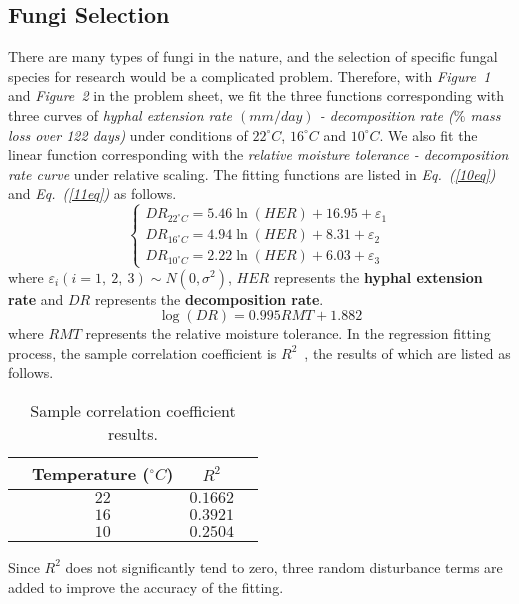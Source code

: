 \subsection{Fungi Selection}
There are many types of fungi in the nature, and the selection of specific fungal species for research would be a complicated problem. Therefore, with \textit{Figure~1} and \textit{Figure~2} in the problem sheet, we fit the three functions corresponding with three curves of \textit{hyphal extension rate $(mm/day)$ - decomposition rate ($\%$ mass loss over 122 days)} under conditions of $22^\circ C$, $16^\circ C$ and $10^\circ C$. We also fit the linear function corresponding with the \textit{relative moisture tolerance - decomposition rate curve} under relative scaling. The fitting functions are listed in \textit{Eq.~(\ref{10eq})} and \textit{Eq.~(\ref{11eq})} as follows.
\begin{equation}
  \label{10eq}
  \begin{cases}
    DR_{22^\circ C} = 5.46 \ln (HER) + 16.95 + \varepsilon_1 \\
    DR_{16^\circ C} = 4.94 \ln (HER) + 8.31 + \varepsilon_2  \\
    DR_{10^\circ C} = 2.22 \ln (HER) + 6.03 + \varepsilon_3
  \end{cases}
\end{equation}
where $\varepsilon_i (i=1,\ 2,\ 3) \sim N(0, \sigma^2)$, $HER$ represents the \textbf{hyphal extension rate} and $DR$ represents the \textbf{decomposition rate}.
\begin{equation}
  \label{11eq}
  \log (DR) = 0.995 RMT +1.882
\end{equation}
where $RMT$ represents the relative moisture tolerance. In the regression fitting process, the sample correlation coefficient is $R^2$~\cite{R2}, the results of which are listed as follows.
\begin{table}[H]
  \centering
  \caption{Sample correlation coefficient results.}
  \label{samplecorrelation}
  \begin{tabular*}{\hsize}{@{\extracolsep{\fill}}cccc}
    \toprule
    & Temperature ($^\circ C$) & $R^2$ & \\
    \midrule
    & $22$ & $0.1662$ & \\
    & $16$ & $0.3921$ & \\
    & $10$ & $0.2504$ & \\
    \bottomrule
  \end{tabular*}
\end{table}
Since $R^2$ does not significantly tend to zero, three random disturbance terms are added to improve the accuracy of the fitting.

